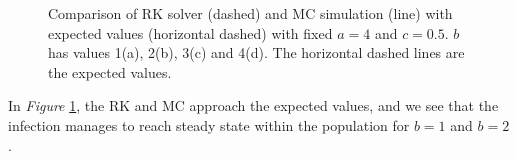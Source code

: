 \begin{figure}[H]
    \caption{Comparison of RK solver (dashed) and MC simulation (line) with expected values (horizontal dashed) with fixed $a=4$ and $c=0.5$. 
    $b$ has values 1(a), 2(b), 3(c) and 4(d). The horizontal dashed lines are the expected values.}
    \label{fig:b}
\end{figure}
In \textit{Figure} \ref{fig:b}, the RK and MC approach the expected values, and we see that the infection manages to reach steady state within the population for $b=1$ and $b=2$.

